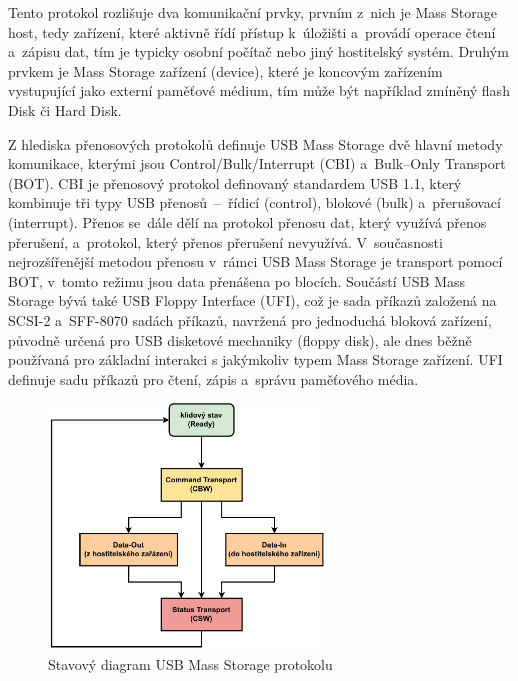 Tento protokol rozlišuje dva komunikační prvky, prvním z~nich je Mass Storage host, tedy zařízení, které aktivně řídí přístup k~úložišti a~provádí operace čtení a~zápisu dat, tím je typicky osobní počítač nebo jiný hostitelský systém. Druhým prvkem je Mass Storage zařízení (device), které je koncovým zařízením vystupující jako externí paměťové médium, tím může být například zmíněný flash Disk či Hard Disk.~\cite{usb_standard_ufi, silicon_labs_mass_storage_protocol}

Z hlediska přenosových protokolů definuje USB Mass Storage dvě hlavní metody komunikace, kterými jsou Control/Bulk/Interrupt (CBI) a~Bulk--Only Transport (BOT). CBI je přenosový protokol definovaný standardem USB 1.1, který kombinuje tři typy USB přenosů~--~řídicí (control), blokové (bulk) a~přerušovací (interrupt). Přenos se~dále dělí na protokol přenosu dat, který využívá přenos přerušení, a~protokol, který přenos přerušení nevyužívá. V~současnosti nejrozšířenější metodou přenosu v~rámci USB Mass Storage je transport pomocí BOT, v~tomto režimu jsou data přenášena po blocích.
Součástí USB Mass Storage bývá také USB Floppy Interface (UFI), což je sada příkazů založená na SCSI-2 a~SFF-8070 sadách příkazů, navržená pro jednoduchá bloková zařízení, původně určená pro USB disketové mechaniky (floppy disk), ale dnes běžně používaná pro základní interakci s jakýmkoliv typem Mass Storage zařízení. UFI definuje sadu příkazů pro čtení, zápis a~správu paměťového média.~\cite{usb_standard_ufi}

\begin{figure}[h]
    \centering
    \includegraphics[width=0.65\textwidth]{obrazky-figures/mass_storage_protocol-cz.pdf}
    
    \caption{Stavový diagram USB Mass Storage protokolu~\cite{silicon_labs_mass_storage_protocol}}
    \label{fig:mass-storage-protocol}
\end{figure}


